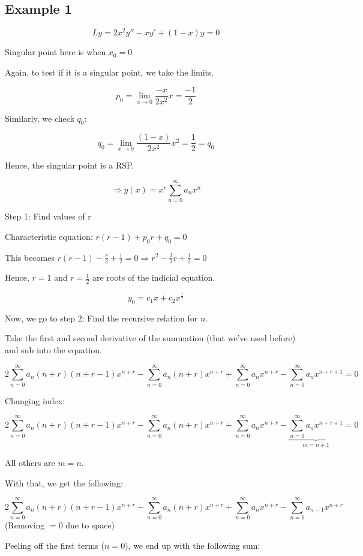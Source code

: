 \documentclass{article}
\begin{document}
\subsection{Example 1}

$$Ly = 2x^2 y'' - x y' + (1-x)y = 0$$

Singular point here is when $x_0 = 0$

Again, to test if it is a singular point, we take the limits. 

$$p_0 = \lim_{x \to 0} \frac{-x}{2x^2} x = \frac{-1}{2}$$

Similarly, we check $q_0$:

$$q_0 = \lim_{x \to 0} \frac{(1-x)}{2x^2} x^2 = \frac{1}{2} = q_0$$

Hence, the singular point is a RSP. 

$$\Rightarrow y(x) = x^r \sum_{n = 0}^\infty a_n x^n$$

Step 1: Find values of r

Characteristic equation: $r(r-1) + p_0 r + q_0 = 0$

This becomes $r(r-1) - \frac{r}{2} + \frac{1}{2} = 0 \Rightarrow r^2 - \frac{3}{2} r + \frac{1}{2} = 0$

Hence, $r = 1$ and $r = \frac{1}{2}$ are roots of the indicial equation. 

$$y_0 = c_1 x + c_2 x^{\frac{1}{2}}$$

Now, we go to step 2: Find the recursive relation for $n$. 

Take the first and second derivative of the summation (that we've used before) and sub into the equation. 

$$2\sum_{n = 0}^{\infty} a_n (n+r)(n+r-1) x^{n+r} - \sum_{n = 0}^{\infty} a_n (n+r) x^{n+r} + \sum_{n = 0}^\infty a_n x^{n+r} - \sum_{n = 0}^\infty a_n x^{n+r+1} = 0$$

Changing index:

$$2\sum_{n = 0}^{\infty} a_n (n+r)(n+r-1) x^{n+r} - \sum_{n = 0}^{\infty} a_n (n+r) x^{n+r} + \sum_{n = 0}^\infty a_n x^{n+r} - \underbrace{\sum_{n = 0}^\infty a_n x^{n+r+1}}_{m = n+1} = 0$$

All others are $m = n$. 

With that, we get the following:

$$2\sum_{n = 0}^{\infty} a_n (n+r)(n+r-1) x^{n+r} - \sum_{n = 0}^{\infty} a_n (n+r) x^{n+r} + \sum_{n = 0}^\infty a_n x^{n+r} - \sum_{n = 1}^\infty a_{n-1} x^{n+r}$$
(Removing $=0$ due to space)

Peeling off the first terms ($n=0$), we end up with the following sum:
\end{document}
